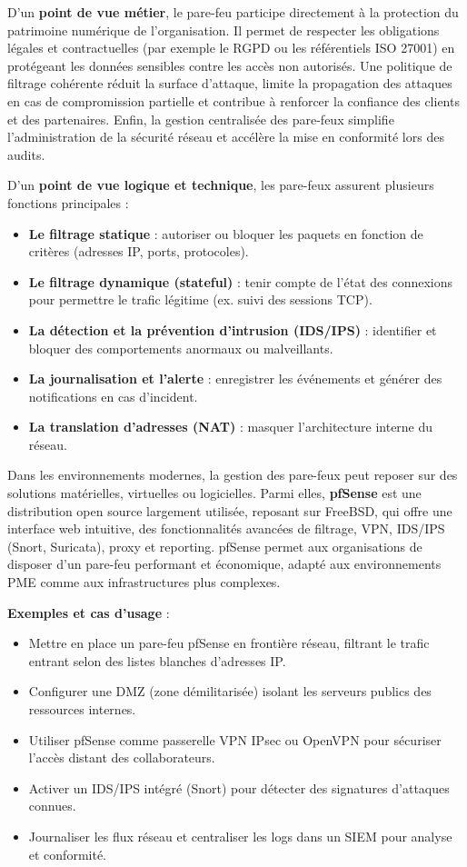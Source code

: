 D’un \textbf{point de vue métier}, le pare-feu participe directement à la protection du patrimoine numérique de l’organisation. Il permet de respecter les obligations légales et contractuelles (par exemple le RGPD ou les référentiels ISO 27001) en protégeant les données sensibles contre les accès non autorisés. Une politique de filtrage cohérente réduit la surface d’attaque, limite la propagation des attaques en cas de compromission partielle et contribue à renforcer la confiance des clients et des partenaires. Enfin, la gestion centralisée des pare-feux simplifie l’administration de la sécurité réseau et accélère la mise en conformité lors des audits.

D’un \textbf{point de vue logique et technique}, les pare-feux assurent plusieurs fonctions principales :
\begin{itemize}
	\item \textbf{Le filtrage statique}  : autoriser ou bloquer les paquets en fonction de critères (adresses IP, ports, protocoles).
	\item \textbf{Le filtrage dynamique (stateful)}  : tenir compte de l’état des connexions pour permettre le trafic légitime (ex. suivi des sessions TCP).
	\item \textbf{La détection et la prévention d’intrusion (IDS/IPS)}  : identifier et bloquer des comportements anormaux ou malveillants.
	\item \textbf{La journalisation et l’alerte}  : enregistrer les événements et générer des notifications en cas d’incident.
	\item \textbf{La translation d’adresses (NAT)}  : masquer l’architecture interne du réseau.
\end{itemize}

Dans les environnements modernes, la gestion des pare-feux peut reposer sur des solutions matérielles, virtuelles ou logicielles. Parmi elles, \textbf{pfSense} est une distribution open source largement utilisée, reposant sur FreeBSD, qui offre une interface web intuitive, des fonctionnalités avancées de filtrage, VPN, IDS/IPS (Snort, Suricata), proxy et reporting. pfSense permet aux organisations de disposer d’un pare-feu performant et économique, adapté aux environnements PME comme aux infrastructures plus complexes.

\textbf{Exemples et cas d’usage} :
\begin{itemize}
	\item Mettre en place un pare-feu pfSense en frontière réseau, filtrant le trafic entrant selon des listes blanches d’adresses IP.
	\item Configurer une DMZ (zone démilitarisée) isolant les serveurs publics des ressources internes.
	\item Utiliser pfSense comme passerelle VPN IPsec ou OpenVPN pour sécuriser l’accès distant des collaborateurs.
	\item Activer un IDS/IPS intégré (Snort) pour détecter des signatures d’attaques connues.
	\item Journaliser les flux réseau et centraliser les logs dans un SIEM pour analyse et conformité.
\end{itemize}


